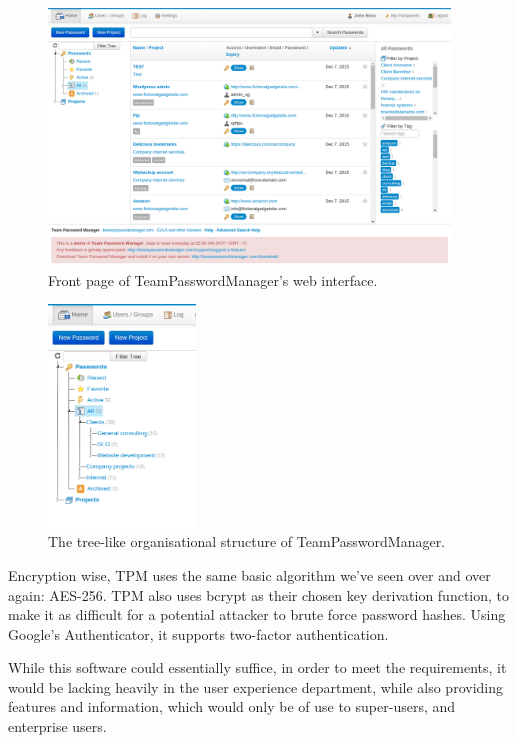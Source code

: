 			\begin{figure}[htbp]
				\centering
				\includegraphics[width=0.95\textwidth]{figures/analysis/teampasswordmanager_main.png}
				\caption{Front page of TeamPasswordManager's web interface.}
				\label{fig:teampasswordmanager_main}
			\end{figure}

			\begin{figure}[htbp]
				\centering
				\includegraphics[width=0.35\textwidth]{figures/analysis/teampasswordmanager_tree.png}
				\caption{The tree-like organisational structure of TeamPasswordManager.}
				\label{fig:teampasswordmanager_tree}
			\end{figure}

			Encryption wise, TPM uses the same basic algorithm we've seen over and over again: AES-256. TPM also uses bcrypt as their chosen key derivation function, to make it as difficult for a potential attacker to brute force password hashes. Using Google's Authenticator, it supports two-factor authentication.


			

			While this software could essentially suffice, in order to meet the requirements, it would be lacking heavily in the user experience department, while also providing features and information, which would only be of use to super-users, and enterprise users.

